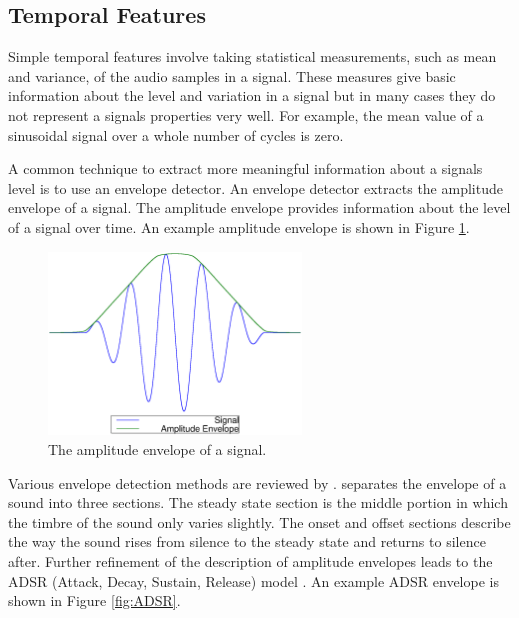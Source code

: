 	\subsection{Temporal Features}
	\label{sec:Timbre-LowLevelFeatures-Temporal}
		Simple temporal features involve taking statistical measurements, such as mean and variance, of the audio
		samples in a signal. These measures give basic information about the level and variation in a signal but in
		many cases they do not represent a signals properties very well. For example, the mean value of a sinusoidal
		signal over a whole number of cycles is zero. 

		A common technique to extract more meaningful information about a signals level is to use an envelope
		detector. An envelope detector extracts the amplitude envelope of a signal. The amplitude envelope provides
		information about the level of a signal over time. An example amplitude envelope is shown in Figure
		\ref{fig:AmplitudeEnvelope}.

		\begin{figure}[h!]
			\centering
			\includegraphics[width=0.6\textwidth]{chapter2/Images/AmplitudeEnvelope.eps}
			\caption{The amplitude envelope of a signal.}
			\label{fig:AmplitudeEnvelope}
		\end{figure}

		Various envelope detection methods are reviewed by \citet{chang2007a}. \citet{howard2009acoustics} separates
		the envelope of a sound into three sections. The steady state section is the middle portion in which the
		timbre of the sound only varies slightly. The onset and offset sections describe the way the sound rises
		from silence to the steady state and returns to silence after. Further refinement of the description of
		amplitude envelopes leads to the ADSR (Attack, Decay, Sustain, Release) model \citep{descrivan2012music}. An
		example ADSR envelope is shown in Figure \ref{fig:ADSR}.

